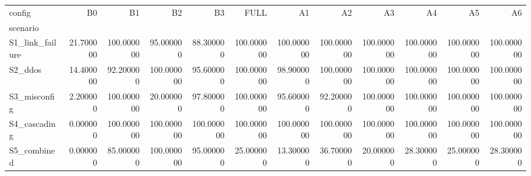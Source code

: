 \begin{tabular}{lrrrrrrrrrrr}
\toprule
config & B0 & B1 & B2 & B3 & FULL & A1 & A2 & A3 & A4 & A5 & A6 \\
scenario &  &  &  &  &  &  &  &  &  &  &  \\
\midrule
S1_link_failure & 21.700000 & 100.000000 & 95.000000 & 88.300000 & 100.000000 & 100.000000 & 100.000000 & 100.000000 & 100.000000 & 100.000000 & 100.000000 \\
S2_ddos & 14.400000 & 92.200000 & 100.000000 & 95.600000 & 100.000000 & 98.900000 & 100.000000 & 100.000000 & 100.000000 & 100.000000 & 100.000000 \\
S3_misconfig & 2.200000 & 100.000000 & 20.000000 & 97.800000 & 100.000000 & 95.600000 & 92.200000 & 100.000000 & 100.000000 & 100.000000 & 100.000000 \\
S4_cascading & 0.000000 & 100.000000 & 100.000000 & 100.000000 & 100.000000 & 100.000000 & 100.000000 & 100.000000 & 100.000000 & 100.000000 & 100.000000 \\
S5_combined & 0.000000 & 85.000000 & 100.000000 & 95.000000 & 25.000000 & 13.300000 & 36.700000 & 20.000000 & 28.300000 & 25.000000 & 28.300000 \\
\bottomrule
\end{tabular}
